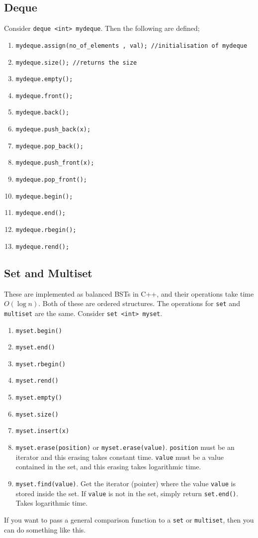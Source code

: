 \documentclass[12pt,a4paper]{amsart}
\numberwithin{equation}{section}
\theoremstyle{definition}
\begin{document}
\subsection{Deque} Consider \verb|deque <int> mydeque|. Then the following are defined; 
\begin{enumerate}
    \item \verb|mydeque.assign(no_of_elements , val); //initialisation of mydeque|
    \item \verb|mydeque.size(); //returns the size|
    \item \verb|mydeque.empty();|
    \item \verb|mydeque.front();|
    \item \verb|mydeque.back();|
    \item \verb|mydeque.push_back(x);|
    \item \verb|mydeque.pop_back();|
    \item \verb|mydeque.push_front(x);|
    \item \verb|mydeque.pop_front();|
    \item \verb|mydeque.begin();|
    \item \verb|mydeque.end();|
    \item \verb|mydeque.rbegin();|
    \item \verb|mydeque.rend();|
\end{enumerate}

\subsection{Set and Multiset} These are implemented as balanced BSTs in C++, and their operations take time $O(\log n)$. Both of these are ordered structures. The operations for \verb|set| and \verb|multiset| are the same. Consider \verb|set <int> myset|. 
\begin{enumerate}
    \item \verb|myset.begin()|
    \item \verb|myset.end()|
    \item \verb|myset.rbegin()|
    \item \verb|myset.rend()|
    \item \verb|myset.empty()|
    \item \verb|myset.size()|
    \item \verb|myset.insert(x)|
    \item \verb|myset.erase(position)| or \verb|myset.erase(value)|. \verb|position| must be an iterator and this erasing takes constant time. \verb|value| must be a value contained in the set, and this erasing takes logarithmic time.
    \item \verb|myset.find(value)|. Get the iterator (pointer) where the value \verb|value| is stored inside the set. If \verb|value| is not in the set, simply return \verb|set.end()|. Takes logarithmic time.
\end{enumerate}
If you want to pass a general comparison function to a \verb|set| or \verb|multiset|, then you can do something like this. 
\end{document}
